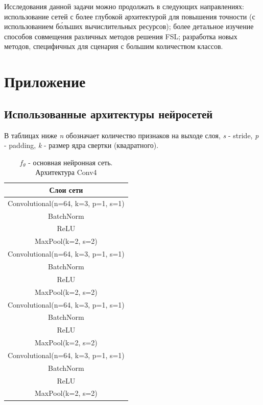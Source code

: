 \documentclass[a4paper, 12pt]{report}
\begin{document}
Исследования данной задачи можно продолжать в следующих направлениях: использование сетей с более глубокой архитектурой для повышения точности (с использованием б\'{о}льших вычислительных ресурсов); более детальное изучение способов совмещения различных методов решения FSL; разработка новых методов, специфичных для сценария с большим количеством классов.




\chapter{Приложение}

\section {Использованные архитектуры нейросетей}

В таблицах ниже \textit{n} обозначает количество признаков на выходе слоя, \textit{s} - stride, \textit{p} - padding, \textit{k} - размер ядра свертки (квадратного).

\begin{table}[H]
\begin{adjustbox}{center}
\begin{tabular}{| c | }
\hline
Слои сети \\
\hline
Convolutional(n=64, k=3, p=1, s=1) \\
\hline
BatchNorm \\
\hline
ReLU \\
\hline
MaxPool(k=2, s=2) \\
\hline
Convolutional(n=64, k=3, p=1, s=1) \\
\hline
BatchNorm \\
\hline
ReLU \\
\hline
MaxPool(k=2, s=2) \\
\hline
Convolutional(n=64, k=3, p=1, s=1) \\
\hline
BatchNorm \\
\hline
ReLU \\
\hline
MaxPool(k=2, s=2) \\
\hline
Convolutional(n=64, k=3, p=1, s=1) \\
\hline
BatchNorm \\
\hline
ReLU \\
\hline
MaxPool(k=2, s=2) \\
\hline
\end{tabular}
\end{adjustbox}
\caption{\centering $f_{\theta}$ - основная нейронная сеть. Архитектура Conv4 \cite{dfmn}}
\end{table}
\end{document}
